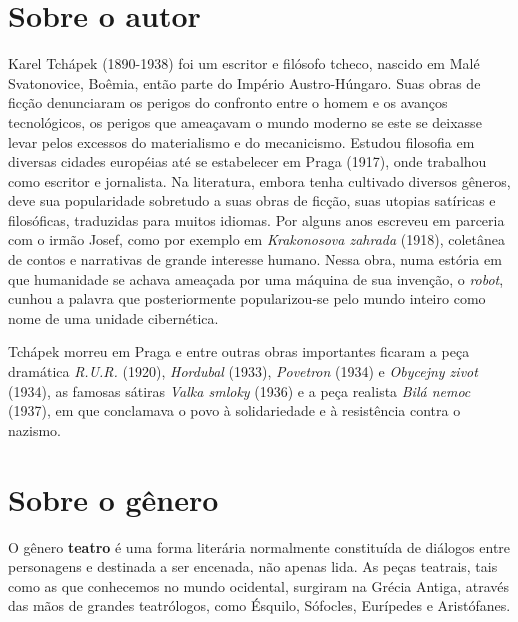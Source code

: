 \documentclass[11pt]{extarticle}
\begin{document}


\section{Sobre o autor}

Karel Tchápek (1890-1938) foi um escritor e filósofo tcheco, nascido em Malé Svatonovice, Boêmia, então parte do Império Austro-Húngaro. Suas obras de ficção denunciaram os perigos do confronto entre o homem e os avanços tecnológicos, os perigos que ameaçavam o mundo moderno se este se deixasse levar pelos excessos do materialismo e do mecanicismo. Estudou filosofia em diversas cidades européias até se estabelecer em Praga (1917), onde trabalhou como escritor e jornalista. Na literatura, embora tenha cultivado diversos gêneros, deve sua popularidade sobretudo a suas obras de ficção, suas utopias satíricas e filosóficas, traduzidas para muitos idiomas. Por alguns anos escreveu em parceria com o irmão Josef, como por exemplo em \textit{Krakonosova zahrada} (1918), coletânea de contos e narrativas de grande interesse humano. Nessa obra, numa estória em que humanidade se achava ameaçada por uma máquina de sua invenção, o \textit{robot}, cunhou a palavra que posteriormente popularizou-se pelo mundo inteiro como nome de uma unidade cibernética. 

Tchápek morreu em Praga e entre outras obras importantes ficaram a peça dramática \textit{R.U.R.} (1920), \textit{Hordubal} (1933), \textit{Povetron} (1934) e \textit{Obycejny zivot} (1934), as famosas sátiras \textit{Valka smloky} (1936) e a peça realista \textit{Bilá nemoc} (1937), em que conclamava o povo à solidariedade e à resistência contra o nazismo.


\section{Sobre o gênero}

O gênero \textbf{teatro} é uma forma literária normalmente constituída de diálogos entre personagens e destinada a ser encenada, não apenas lida. As peças teatrais, tais como as que conhecemos no mundo ocidental, surgiram na Grécia Antiga, através das mãos de grandes teatrólogos, como Ésquilo, Sófocles, Eurípedes e Aristófanes.
\end{document}
